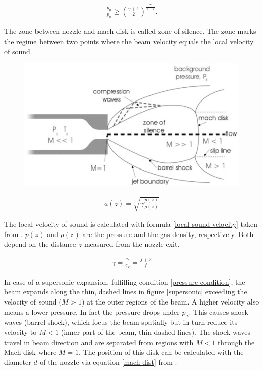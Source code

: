 \documentclass[parskip,12pt,headsepline,a4paper] {scrbook}
\begin{document}
\begin{align}  \label{pressure-condition}
\frac{p_0}{p_a} \geq \left(\frac{\gamma + 1}{2}\right)^{\frac{\gamma}{\gamma - 1}}.
\end{align}

The zone between nozzle and mach disk is called zone of silence. The zone marks the regime between two points where the beam velocity equals the local velocity of sound.

\begin{figure}[ht]
\centerline{
\includegraphics[width=13cm]{./expansion/supersonic-expansion.jpg}}
\end{figure}

\begin{align}  \label{local-sound-velocity}
a(z) = \sqrt{\gamma \frac{p(z)}{\rho(z)}}
\end{align}

The local velocity of sound is calculated with formula \ref{local-sound-velocity} taken from \cite{scoles}. $p(z)$ and $\rho(z)$ are the pressure and the gas density, respectively. Both depend on the distance $z$ measured from the nozzle exit.


\begin{align}  \label{adiabatic-exponent}
\gamma = \frac{c_p}{c_V} = \frac{f+2}{f}
\end{align}

In case of a supersonic expansion, fulfilling condition \ref{pressure-condition}, the beam expands along the thin, dashed lines in figure \ref{supersonic} exceeding the velocity of sound ($M > 1$) at the outer regions of the beam. A higher velocity also means a lower pressure. In fact the pressure drops under $p_a$. This causes shock waves (barrel shock), which focus the beam spatially but in turn reduce its velocity to $M < 1$ (inner part of the beam, thin dashed lines). The shock waves travel in beam direction and are separated from regions with $M < 1$ through the Mach disk where $M = 1$. The position of this disk can be calculated with the diameter $d$ of the nozzle via equation \ref{mach-dist} from \cite{pauly}.
\end{document}
